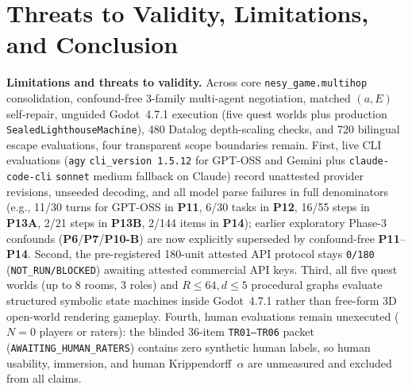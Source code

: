 \FloatBarrier
\section{Threats to Validity, Limitations, and Conclusion}\label{sec:conclusion}
\textbf{Limitations and threats to validity.} Across core \texttt{nesy\_\allowbreak game.\allowbreak multihop} consolidation, confound-free 3-family multi-agent negotiation, matched $(a,E)$ self-repair, unguided Godot~4.7.1 execution (five quest worlds plus production \texttt{Sealed\allowbreak Lighthouse\allowbreak Machine}), 480 Datalog depth-scaling checks, and 720 bilingual escape evaluations, four transparent scope boundaries remain. First, live CLI evaluations (\texttt{agy} \texttt{cli\_version~1.5.12} for GPT-OSS and Gemini plus \texttt{claude-code-cli} \texttt{sonnet} medium fallback on Claude) record unattested provider revisions, unseeded decoding, and all model parse failures in full denominators (e.g., 11/30 turns for GPT-OSS in \textbf{P11}, 6/30 tasks in \textbf{P12}, 16/55 steps in \textbf{P13A}, 2/21 steps in \textbf{P13B}, 2/144 items in \textbf{P14}); earlier exploratory Phase-3 confounds (\textbf{P6}/\textbf{P7}/\textbf{P10-B}) are now explicitly superseded by confound-free \textbf{P11}--\textbf{P14}. Second, the pre-registered 180-unit attested API protocol stays \texttt{0/180} (\texttt{NOT\_RUN/BLOCKED}) awaiting attested commercial API keys. Third, all five quest worlds (up to 8 rooms, 3 roles) and $R{\le}64, d{\le}5$ procedural graphs evaluate structured symbolic state machines inside Godot~4.7.1 rather than free-form 3D open-world rendering gameplay. Fourth, human evaluations remain unexecuted ($N{=}0$ players or raters): the blinded 36-item \texttt{TR01--TR06} packet (\texttt{AWAITING\_}\allowbreak\texttt{HUMAN\_}\allowbreak\texttt{RATERS}) contains zero synthetic human labels, so human usability, immersion, and human Krippendorff~$\alpha$ are unmeasured and excluded from all claims.

